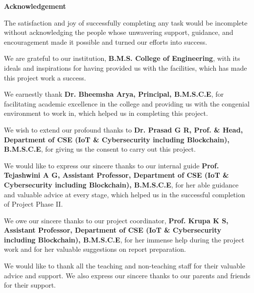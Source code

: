 \documentclass[12pt,a4paper]{report}
\begin{document}
\begingroup
  \let\cleardoublepage\relax
  \thispagestyle{empty}
  \vspace*{-1.5cm}
  \begin{center}
    {\Large\bfseries Acknowledgement\par}
  \end{center}
  \vspace{1cm}

  \noindent
  The satisfaction and joy of successfully completing any task would be incomplete without acknowledging the people whose unwavering support, guidance, and encouragement made it possible and turned our efforts into success.

  \vspace{0.6cm}
  \noindent
  We are grateful to our institution, \textbf{B.M.S. College of Engineering}, with its ideals and inspirations for having provided us with the facilities, which has made this project work a success.

  \vspace{0.6cm}
  \noindent
  We earnestly thank \textbf{Dr. Bheemsha Arya, Principal, B.M.S.C.E}, for facilitating academic excellence in the college and providing us with the congenial environment to work in, which helped us in completing this project.

  \vspace{0.6cm}
  \noindent
  We wish to extend our profound thanks to \textbf{Dr. Prasad G R, Prof. \& Head, Department of CSE (IoT \& Cybersecurity including Blockchain), B.M.S.C.E}, for giving us the consent to carry out this project.

  \vspace{0.6cm}
  \noindent
  We would like to express our sincere thanks to our internal guide \textbf{Prof. Tejashwini A G, Assistant Professor, Department of CSE (IoT \& Cybersecurity including Blockchain), B.M.S.C.E}, for her able guidance and valuable advice at every stage, which helped us in the successful completion of Project Phase II.

  \vspace{0.6cm}
  \noindent
  We owe our sincere thanks to our project coordinator, \textbf{Prof. Krupa K S, Assistant Professor, Department of CSE (IoT \& Cybersecurity including Blockchain), B.M.S.C.E}, for her immense help during the project work and for her valuable suggestions on report preparation.

  \vspace{0.6cm}
  \noindent
  We would like to thank all the teaching and non-teaching staff for their valuable advice and support. We also express our sincere thanks to our parents and friends for their support.
\end{document}
